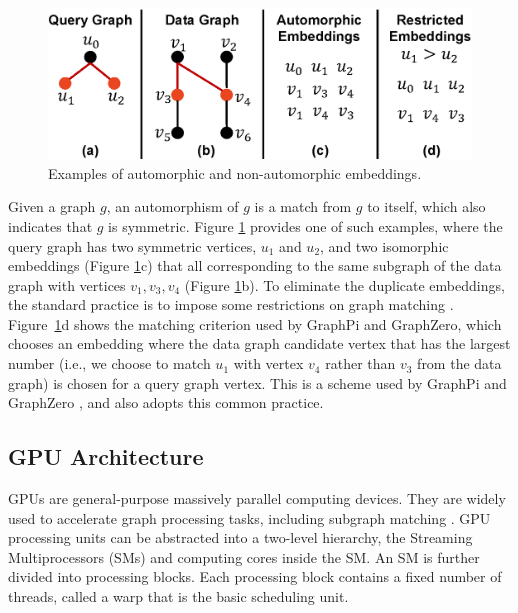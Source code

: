 \begin{figure}[t!]
\centering
\includegraphics[width=\columnwidth]{./figure/automorphism.eps}
\caption{Examples of automorphic and non-automorphic embeddings.}	
\label{fig:automo}
\end{figure}

 Given a graph $g$, an automorphism of $g$ is a match from $g$ to itself, which also indicates that $g$ is symmetric. Figure \ref{fig:automo} provides one of such examples, where the query graph has two symmetric vertices, $u_1$ and $u_2$, and two isomorphic embeddings (Figure \ref{fig:automo}c) that all corresponding to the same subgraph of the data graph with vertices $v_1, v_3, v_4$ (Figure \ref{fig:automo}b). To eliminate the duplicate embeddings, the standard practice is to impose some
restrictions on graph matching \cite{ mawhirter2019graphzero, shi2020graphpi}. Figure~\ref{fig:automo}d shows the matching criterion used
by GraphPi and GraphZero, which chooses an embedding where the data graph candidate vertex that has the largest number (i.e., we choose to
match $u_1$ with vertex $v_4$ rather than $v_3$ from the data graph) is chosen for a query graph vertex. This is a scheme used by GraphPi
\cite{shi2020graphpi} and GraphZero \cite{mawhirter2019graphzero}, and \SystemName also adopts this common practice.

\subsection{GPU Architecture}
GPUs are general-purpose massively parallel computing devices. They are widely used to accelerate graph processing tasks, including subgraph matching \cite{zeng2020gsi,guo2020exploiting,guo2020gpu}. GPU processing units can be abstracted into a two-level hierarchy, the Streaming Multiprocessors (SMs)
and computing cores inside the SM. An SM is further divided into processing blocks. Each processing block contains a fixed number of
threads, called a warp that is the basic scheduling unit.

